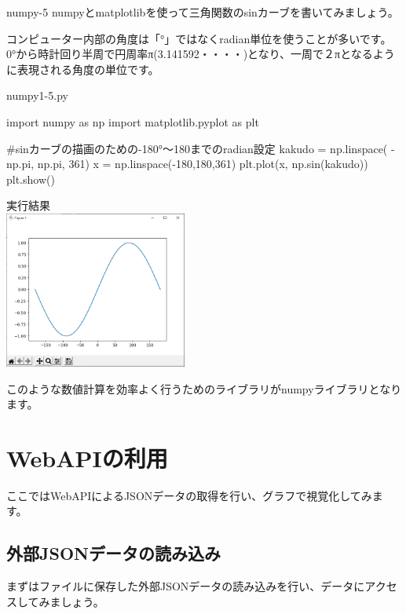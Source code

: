 \begin{pabox}{numpy-5}
numpyとmatplotlibを使って三角関数のsinカーブを書いてみましょう。

コンピューター内部の角度は「°」ではなくradian単位を使うことが多いです。
0°から時計回り半周で円周率π(3.141592・・・・)となり、一周で２πとなるように表現される角度の単位です。

\begin{legbox}{numpy1-5.py}
\begin{listing}{1}
import numpy as np 
import matplotlib.pyplot as plt

#sinカーブの描画のための-180°～180までのradian設定
kakudo = np.linspace( -np.pi, np.pi, 361)
x = np.linspace(-180,180,361)
plt.plot(x, np.sin(kakudo))
plt.show()
\end{listing}

実行結果\\

\includegraphics[width=6cm]{images/graph6.png} 

\end{legbox}


\end{pabox}
このような数値計算を効率よく行うためのライブラリがnumpyライブラリとなります。

\newpage
\section{WebAPIの利用}
ここではWebAPIによるJSONデータの取得を行い、グラフで視覚化してみます。

\subsection{外部JSONデータの読み込み}

まずはファイルに保存した外部JSONデータの読み込みを行い、データにアクセスしてみましょう。


